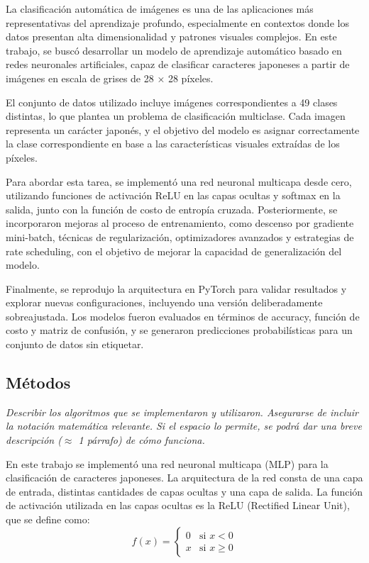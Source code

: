 \documentclass[11pt]{article}
\begin{document}
La clasificación automática de imágenes es una de las aplicaciones más representativas del aprendizaje profundo, especialmente en contextos donde los datos presentan alta dimensionalidad y patrones visuales complejos. En este trabajo, se buscó desarrollar un modelo de aprendizaje automático basado en redes neuronales artificiales, capaz de clasificar caracteres japoneses a partir de imágenes en escala de grises de 28 × 28 píxeles.

El conjunto de datos utilizado incluye imágenes correspondientes a 49 clases distintas, lo que plantea un problema de clasificación multiclase. Cada imagen representa un carácter japonés, y el objetivo del modelo es asignar correctamente la clase correspondiente en base a las características visuales extraídas de los píxeles.

Para abordar esta tarea, se implementó una red neuronal multicapa desde cero, utilizando funciones de activación ReLU en las capas ocultas y softmax en la salida, junto con la función de costo de entropía cruzada. Posteriormente, se incorporaron mejoras al proceso de entrenamiento, como descenso por gradiente mini-batch, técnicas de regularización, optimizadores avanzados y estrategias de rate scheduling, con el objetivo de mejorar la capacidad de generalización del modelo.

Finalmente, se reprodujo la arquitectura en PyTorch para validar resultados y explorar nuevas configuraciones, incluyendo una versión deliberadamente sobreajustada. Los modelos fueron evaluados en términos de accuracy, función de costo y matriz de confusión, y se generaron predicciones probabilísticas para un conjunto de datos sin etiquetar.

\subsection{Métodos}
\textit{Describir los algoritmos que se implementaron y utilizaron. Asegurarse de incluir la notación matemática relevante. Si el espacio lo permite, se podrá dar una breve descripción ($\approx$ 1 párrafo) de cómo funciona.}

En este trabajo se implementó una red neuronal multicapa (MLP) para la clasificación de caracteres japoneses. La arquitectura de la red consta de una capa de entrada, distintas cantidades de capas ocultas y una capa de salida. La función de activación utilizada en las capas ocultas es la ReLU (Rectified Linear Unit), que se define como:
\[
f(x) = \begin{cases}
    0 & \text{si } x < 0 \\
    x & \text{si } x \geq 0
\end{cases}
\]
\end{document}
